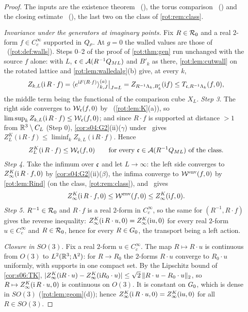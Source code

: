 \begin{proof}
The inputs are the existence theorem \EC\ (), the torus comparison \Kz\ () and the closing estimate \TIz\ (), the last two on the class of \cref{rot:rem:class}.

\emph{Invariance under the generators at imaginary points.} Fix $R\in\mathcal R_0$ and a real $2$-form $f\in C^\infty_c$ supported in
$Q_{\rho}$. At $g=0$ the walled values are those of \Kz\ (\cref{rot:def:walls}). Steps 0--2 of the proof of \cref{rot:thm:gen} run
unchanged with the source $f$ alone: with $L$, $\mathfrak c\in\mathcal A(R^{-1}Q_{ML})$ and $B'_k$ as there, \cref{rot:lem:cutwall} on the rotated
lattice and \cref{rot:lem:walledalg}(b) give, at every $k$,
\[
Z_{k,L}(\mathrm i\,R\cdot f)=\langle e^{\mathrm iF(R\cdot f)}\rangle^{(a)}_{k,J}\big|_{J=L}=Z_{R^{-1}\Lambda_k,B'_k}(\mathrm if)\le T_{\mathfrak c,R^{-1}\Lambda_k}(f,0),
\]
the middle term being the functional of the comparison cube $X_L$. \emph{Step 3.} The right side converges to $\mathcal W_{\mathfrak c}(f,0)$ by \Kz\
(\cref{rot:lem:K}(a)), so $\limsup_kZ_{k,L}(\mathrm i\,R\cdot f)\le\mathcal W_{\mathfrak c}(f,0)$; and since $R\cdot f$ is supported at distance $>1$ from
$\mathbb R^3\setminus C_L$ (Step 0), \cref{cor:s04:G2}(ii)($\gamma$) under \EC\ gives $Z^K_L(\mathrm i\,R\cdot f)\le\liminf_kZ_{k,L}(\mathrm i\,R\cdot f)$.
Hence
\[
Z^K_L(\mathrm i\,R\cdot f)\le\mathcal W_{\mathfrak c}(f,0)\qquad\text{for every }\mathfrak c\in\mathcal A(R^{-1}Q_{ML})\text{ of the class}.
\]
\emph{Step 4.} Take the infimum over $\mathfrak c$ and let $L\to\infty$: the left side converges to $Z^{K}_{\infty}(\mathrm i\,R\cdot f,0)$ by
\cref{cor:s04:G2}(ii)($\beta$), the infima converge to $\mathcal W^{\mathrm{env}}(f,0)$ by \cref{rot:lem:Rind} (on the class, \cref{rot:rem:class}), and
\TIz\ gives
\[
Z^{K}_{\infty}(\mathrm i\,R\cdot f,0)\le\mathcal W^{\mathrm{env}}(f,0)\le Z^{K}_{\infty}(\mathrm if,0).
\]
\emph{Step 5.} $R^{-1}\in\mathcal R_0$ and $R\cdot f$ is a real $2$-form in $C^\infty_c$, so the same for $(R^{-1},R\cdot f)$ gives the reverse
inequality: $Z^{K}_{\infty}(\mathrm i\,R\cdot u,0)=Z^{K}_{\infty}(\mathrm iu,0)$ for every real $2$-form $u\in C^\infty_c$ and $R\in\mathcal R_0$, hence for
every $R\in G_0$, the transport being a left action.

\emph{Closure in $SO(3)$.} Fix a real $2$-form $u\in C^\infty_c$. The map $R\mapsto R\cdot u$ is continuous from $O(3)$ to
$L^2(\mathbb R^3;\Lambda^2)$: for $R\to R_0$ the $2$-forms $R\cdot u$ converge to $R_0\cdot u$ uniformly, with supports in one compact set. By the
Lipschitz bound of \cref{cor:s06:TK}, $|Z^{K}_{\infty}(\mathrm iR\cdot u)-Z^{K}_{\infty}(\mathrm iR_0\cdot u)|\le\sqrt2\,\lVert R\cdot u-R_0\cdot u\rVert_2$, so
$R\mapsto Z^{K}_{\infty}(\mathrm i\,R\cdot u,0)$ is continuous on $O(3)$. It is constant on $G_0$, which is dense in $SO(3)$
(\cref{rot:lem:geom}(d)); hence $Z^{K}_{\infty}(\mathrm i\,R\cdot u,0)=Z^{K}_{\infty}(\mathrm iu,0)$ for all $R\in SO(3)$.


\end{proof}
